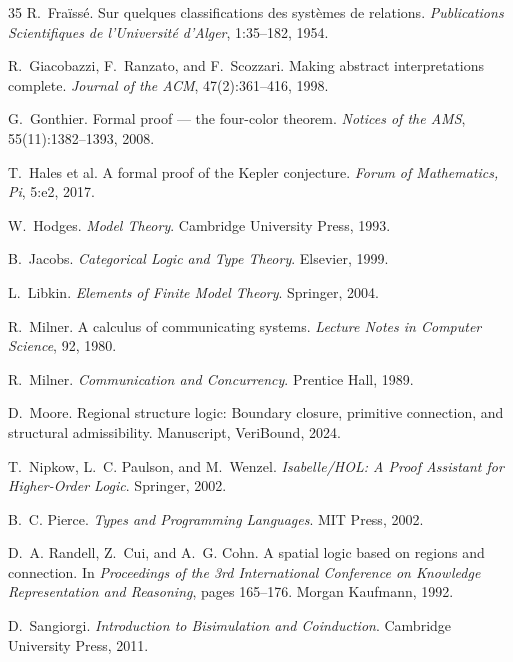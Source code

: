 \documentclass[12pt]{article}
\theoremstyle{plain}
\theoremstyle{definition}
\theoremstyle{remark}
\begin{document}
\begin{thebibliography}{35}
R.~Fra\"{i}ss\'{e}.
\newblock Sur quelques classifications des syst\`{e}mes de relations.
\newblock \emph{Publications Scientifiques de l'Universit\'{e} d'Alger},
  1:35--182, 1954.

R.~Giacobazzi, F.~Ranzato, and F.~Scozzari.
\newblock Making abstract interpretations complete.
\newblock \emph{Journal of the {ACM}}, 47(2):361--416, 1998.

G.~Gonthier.
\newblock Formal proof --- the four-color theorem.
\newblock \emph{Notices of the {AMS}}, 55(11):1382--1393, 2008.

T.~Hales et al.
\newblock A formal proof of the {Kepler} conjecture.
\newblock \emph{Forum of Mathematics, Pi}, 5:e2, 2017.

W.~Hodges.
\newblock \emph{Model Theory}.
\newblock Cambridge University Press, 1993.

B.~Jacobs.
\newblock \emph{Categorical Logic and Type Theory}.
\newblock Elsevier, 1999.

L.~Libkin.
\newblock \emph{Elements of Finite Model Theory}.
\newblock Springer, 2004.

R.~Milner.
\newblock A calculus of communicating systems.
\newblock \emph{Lecture Notes in Computer Science}, 92, 1980.

R.~Milner.
\newblock \emph{Communication and Concurrency}.
\newblock Prentice Hall, 1989.

D.~Moore.
\newblock Regional structure logic: Boundary closure, primitive connection, and
  structural admissibility.
\newblock Manuscript, VeriBound, 2024.

T.~Nipkow, L.~C. Paulson, and M.~Wenzel.
\newblock \emph{Isabelle/{HOL}: A Proof Assistant for Higher-Order Logic}.
\newblock Springer, 2002.

B.~C. Pierce.
\newblock \emph{Types and Programming Languages}.
\newblock MIT Press, 2002.

D.~A. Randell, Z.~Cui, and A.~G. Cohn.
\newblock A spatial logic based on regions and connection.
\newblock In \emph{Proceedings of the 3rd International Conference on
  Knowledge Representation and Reasoning}, pages 165--176.
  Morgan Kaufmann, 1992.

D.~Sangiorgi.
\newblock \emph{Introduction to Bisimulation and Coinduction}.
\newblock Cambridge University Press, 2011.


\end{thebibliography}
\end{document}
